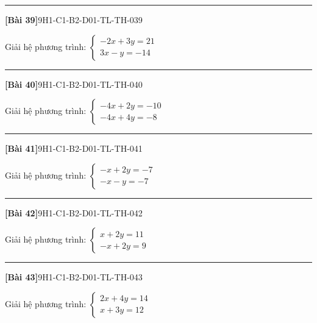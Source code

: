 \documentclass[12pt,a4paper]{article}
\newif\ifloigiai
\newenvironment{cauhoi}[2]{%
  \par\medskip\noindent\rule{\textwidth}{0.4pt}\par\nopagebreak
  \noindent\textbf{[#1]}\hfill{\scriptsize\ttfamily #2}\par\nopagebreak\smallskip}{\par}
\newcommand{\loigiai}[1]{\ifloigiai\par\smallskip\noindent\textit{Lời giải.} #1\par\fi}
\begin{document}
\begin{cauhoi}{Bài 39}{9H1-C1-B2-D01-TL-TH-039}
Giải hệ phương trình: $\begin{cases}-2x + 3y=21\\ 3x - y=-14\end{cases}$
\loigiai{Nhân hai vế của phương trình thứ nhất với $-1$ và phương trình thứ hai với $-3$ rồi cộng từng vế để khử $y$: $-7x=21$, suy ra $x=-3$. Thay $x=-3$ vào phương trình thứ nhất: $-2\cdot(-3)+3y=21$, suy ra $y=5$. Vậy hệ có nghiệm $(x;y)=(-3;5)$.}
\end{cauhoi}
\begin{cauhoi}{Bài 40}{9H1-C1-B2-D01-TL-TH-040}
Giải hệ phương trình: $\begin{cases}-4x + 2y=-10\\ -4x + 4y=-8\end{cases}$
\loigiai{Nhân hai vế của phương trình thứ nhất với $2$ và phương trình thứ hai với $-1$ rồi cộng từng vế để khử $y$: $-4x=-12$, suy ra $x=3$. Thay $x=3$ vào phương trình thứ nhất: $-4\cdot(3)+2y=-10$, suy ra $y=1$. Vậy hệ có nghiệm $(x;y)=(3;1)$.}
\end{cauhoi}
\begin{cauhoi}{Bài 41}{9H1-C1-B2-D01-TL-TH-041}
Giải hệ phương trình: $\begin{cases}-x + 2y=-7\\ -x - y=-7\end{cases}$
\loigiai{Nhân hai vế của phương trình thứ nhất với $-1$ và phương trình thứ hai với $-2$ rồi cộng từng vế để khử $y$: $3x=21$, suy ra $x=7$. Thay $x=7$ vào phương trình thứ nhất: $-1\cdot(7)+2y=-7$, suy ra $y=0$. Vậy hệ có nghiệm $(x;y)=(7;0)$.}
\end{cauhoi}
\begin{cauhoi}{Bài 42}{9H1-C1-B2-D01-TL-TH-042}
Giải hệ phương trình: $\begin{cases}x + 2y=11\\ -x + 2y=9\end{cases}$
\loigiai{Nhân hai vế của phương trình thứ nhất với $1$ và phương trình thứ hai với $-1$ rồi cộng từng vế để khử $y$: $2x=2$, suy ra $x=1$. Thay $x=1$ vào phương trình thứ nhất: $1\cdot(1)+2y=11$, suy ra $y=5$. Vậy hệ có nghiệm $(x;y)=(1;5)$.}
\end{cauhoi}
\begin{cauhoi}{Bài 43}{9H1-C1-B2-D01-TL-TH-043}
Giải hệ phương trình: $\begin{cases}2x + 4y=14\\ x + 3y=12\end{cases}$
\loigiai{Nhân hai vế của phương trình thứ nhất với $3$ và phương trình thứ hai với $-4$ rồi cộng từng vế để khử $y$: $2x=-6$, suy ra $x=-3$. Thay $x=-3$ vào phương trình thứ nhất: $2\cdot(-3)+4y=14$, suy ra $y=5$. Vậy hệ có nghiệm $(x;y)=(-3;5)$.}
\end{cauhoi}
\end{document}
